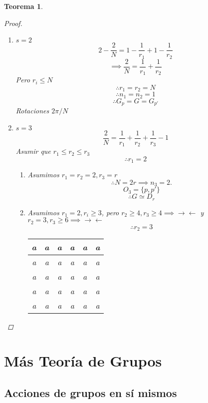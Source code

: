 \documentclass[11pt]{book}
\newcommand{\contr}{\rightarrow\leftarrow}
\newtheorem{thm}{Teorema}[section]
\theoremstyle{definition}
\begin{document}
\begin{thm}
\begin{proof}
\begin{enumerate}[label=(\arabic* órbitas):]
			\item $s=2$
			\[2-\frac{2}{N}=1-\frac{1}{r_1}+1-\frac{1}{r_2}\]
			\[\implies\frac{2}{N}=\frac{1}{r_1}+\frac{1}{r_2}\]
			Pero $r_i\leq N$
			\[\therefore r_1=r_2=N\]
			\[\therefore n_1=n_2=1\]
			\[\therefore G_p=G=G_{p'}\]
			Rotaciones $2\pi/N$

			\item $s=3$
			\[\frac{2}{N}=\frac{1}{r_1}+\frac{1}{r_2}+\frac{1}{r_3}-1\]
			Asumir que $r_1\leq r_2\leq r_3$
			\[\therefore r_1=2\]
			\begin{enumerate}[label=(\roman*)]
				\item Asumimos $r_1=r_2=2,r_3=r$
				\[\therefore N=2r\implies n_3=2.\]
				\[O_3=\{p,p'\}\]
				\[\therefore G\simeq D_r\]

				\item Asumimos $r_1=2,r_i\geq 3$, pero $r_2\geq 4, r_3\geq 4\implies \contr$ y $r_2=3, r_3\geq 6\implies \contr$
				\[\therefore r_2=3\]
				\begin{center}
					\begin{tabular}{ c | c | c | c | c | c }
						a & a & a & a & a & a \\ \hline
						a & a & a & a & a & a \\
						a & a & a & a & a & a \\
						a & a & a & a & a & a \\
						a & a & a & a & a & a
					\end{tabular}
				\end{center}
			\end{enumerate}
		\end{enumerate}
	\end{proof}
\end{thm}
\chapter{Más Teoría de Grupos}
\section{Acciones de grupos en sí mismos}
\end{document}
